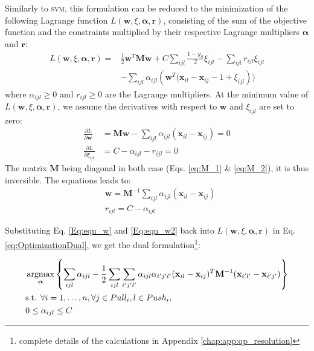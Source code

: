 \noindent Similarly to \textsc{svm}, this formulation can be reduced to the minimization of the following Lagrange function $L(\textbf{w},\xi,\boldsymbol{\alpha},\textbf{r})$, consisting of the sum of the objective function and the constraints multiplied by their respective Lagrange multipliers $\boldsymbol{\alpha}$ and $\textbf{r}$:
\begin{equation}
\begin{aligned}
L(\textbf{w},\xi,\boldsymbol{\alpha},\textbf{r}) 
= & 
\frac{1}{2} \textbf{w}^T \textbf{M} \textbf{w}
+ C \sum\limits_{ijl} \frac{1-y_{il}}{2} \xi_{ijl} - \sum\limits_{ijl}r_{ijl} \xi_{ijl} \\
&  - \sum\limits_{ijl} \alpha_{ijl}\left( \textbf{w}^T(\textbf{x}_{il}-\textbf{x}_{ij}-1+\xi_{ijl} \right))
\label{eq:OptimizationDual}
\end{aligned}
\end{equation}
\noindent where $\alpha_{ijl} \geq 0$ and $r_{ijl} \geq 0$ are the Lagrange multipliers. At the minimum value of $L(\textbf{w},\xi,\boldsymbol{\alpha},\textbf{r})$, we assume the derivatives with respect to $\textbf{w}$ and $\xi_{ijl}$ are set to zero:
\begin{align*}
	\frac{\partial L}{\partial \textbf{w}} 
	& = 
	\textbf{M} \textbf{w} 
	- \sum\limits_{ijl} \alpha_{ijl}(\textbf{x}_{il}-\textbf{x}_{ij}) 
	= 0 \\
	\frac{\partial L}{\partial \xi_{ijl}} & = C - \alpha_{ijl} - r_{ijl} = 0
\end{align*}
\noindent The matrix $\textbf{M}$ being diagonal in both case (Eqs. \ref{eq:M_1} \& \ref{eq:M_2}), it is thus inversible. The equations leads to:
\begin{align}
	& \textbf{w} = \textbf{M}^{-1}  
	\sum\limits_{ijl} \alpha_{ijl}(\textbf{x}_{il}-\textbf{x}_{ij}) \label{Eq:eqn_w} 
	\\ 
	& r_{ijl} = C - \alpha_{ijl} \label{Eq:eqn_w2}
\end{align}

\noindent Substituting Eq. \ref{Eq:eqn_w} and \ref{Eq:eqn_w2} back into $L(\textbf{w},\xi,\boldsymbol{\alpha},\textbf{r})$ in Eq. \ref{eq:OptimizationDual}, we get the dual formulation\footnote{complete details of the calculations in Appendix \ref{chap:app:qp_resolution}}:

\begin{equation}
	\begin{aligned}
	&\displaystyle \argmax_{\boldsymbol{\alpha}} \left\lbrace 
	\sum\limits_{ijl} \alpha_{ijl} 
	- \frac{1}{2} \sum\limits_{ijl} \sum\limits_{i'j'l'}
	\alpha_{ijl} \alpha_{i'j'l'}
	(\textbf{x}_{il}-\textbf{x}_{ij})^T
	\textbf{M}^{-1}
	(\textbf{x}_{i'l'}-\textbf{x}_{i'j'}) \right\rbrace \\
	&\text{s.t.  } \forall i = 1, \ldots, n, \forall j \in Pull_i, l \in Push_i, \\
	& 0 \leq \alpha_{ijl} \leq C
	\end{aligned}
	\label{eq:OptimDual}
\end{equation}


